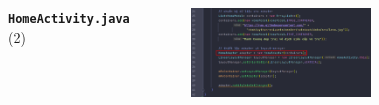 \documentclass{beamer}
\begin{document}
\begin{frame}
\begin{columns}
\begin{figure}
        \end{figure}
        \indent \textbf{\texttt{HomeActivity.java}} (2)
        \begin{figure}
            \centering
            \includegraphics[width=\textwidth]{images/23.png}
        \end{figure}
    \end{columns}
\end{frame}
\end{document}
